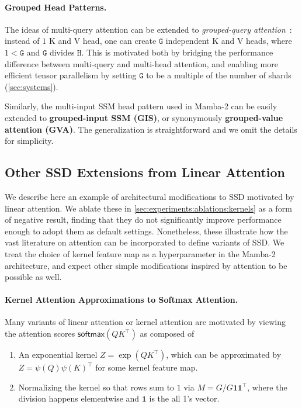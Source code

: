 \paragraph{Grouped Head Patterns.}

The ideas of multi-query attention can be extended to \emph{grouped-query attention}~\citep{ainslie2023gqa}: instead of $1$ K and V head, one can create $\mathtt{G}$ independent K and V heads, where $1 < \mathtt{G}$ and $\mathtt{G}$ divides $\mathtt{H}$.
This is motivated both by bridging the performance difference between multi-query and multi-head attention,
and enabling more efficient tensor parallelism by setting $\mathtt{G}$ to be a multiple of the number of shards (\cref{sec:systems}).

Similarly, the multi-input SSM head pattern used in Mamba-2 can be easily extended to \textbf{grouped-input SSM (GIS)}, or synonymously \textbf{grouped-value attention (GVA)}.
The generalization is straightforward and we omit the details for simplicity.


\subsection{Other SSD Extensions from Linear Attention}
\label{sec:architecture:kernels}

We describe here an example of architectural modifications to SSD motivated by linear attention.
We ablate these in \cref{sec:experiments:ablations:kernels} as a form of negative result,
finding that they do not significantly improve performance enough to adopt them as default settings.
Nonetheless, these illustrate how the vast literature on attention can be incorporated to
define variants of SSD.
We treat the choice of kernel feature map as a hyperparameter in the Mamba-2 architecture,
and expect other simple modifications inspired by attention to be possible as well.

\paragraph{Kernel Attention Approximations to Softmax Attention.}
Many variants of linear attention or kernel attention are motivated by viewing the attention scores $\mathsf{softmax}(QK^{\top})$ as composed of
\begin{enumerate}
  \item An exponential kernel $Z = \exp(QK^{\top})$, which can be approximated by $Z = \psi(Q)\psi(K)^{\top}$ for some kernel feature map.
  \item Normalizing the kernel so that rows sum to $1$ via $M = G / G \bm{1} \bm{1}^{\top}$, where the division happens elementwise and $\bm{1}$ is the all 1's vector.
\end{enumerate}

